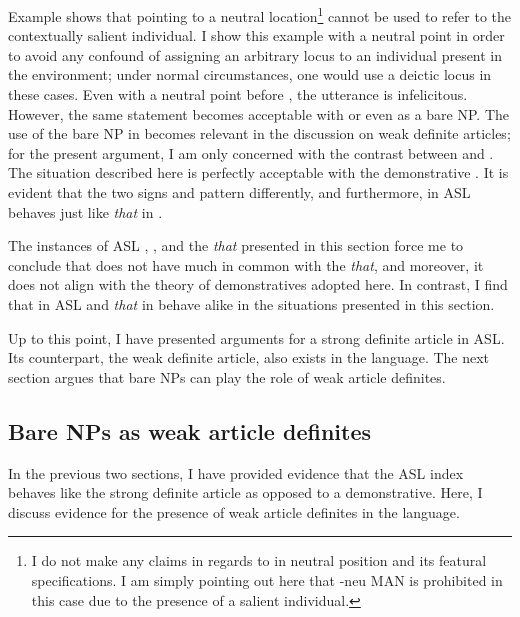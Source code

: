 \documentclass[output=paper,
modfonts
]{langscibook}
\begin{document}
Example  shows that  pointing to a neutral location\footnote{I do not make any claims in regards to  in neutral position and its featural specifications. I am simply pointing out here that -neu MAN is prohibited in this case due to the presence of a salient individual.} cannot be used to refer to the contextually salient individual. I show this example with a neutral point in order to avoid any confound of assigning an arbitrary locus to an individual present in the environment; under normal circumstances, one would use a deictic locus in these cases. Even with a neutral point before , the utterance is infelicitous. However, the same statement becomes acceptable with  or even as a bare NP. The use of the bare NP in  becomes relevant in the discussion on weak definite articles; for the present argument, I am only concerned with the contrast between  and . The situation described here is perfectly acceptable with the demonstrative . It is evident that the two signs  and  pattern differently, and furthermore,  in ASL behaves just like \textit{that} in .   

The instances of ASL , , and the  \textit{that} presented in this section force me to conclude that  does not have much in common with the  \textit{that}, and moreover, it does not align with the theory of demonstratives adopted here. In contrast, I find that  in ASL and \textit{that} in  behave alike in the situations presented in this section.

Up to this point, I have presented arguments for a strong definite article in ASL. Its counterpart, the weak definite article, also exists in the language. The next section argues that bare NPs can play the role of weak article definites. 

\subsection{Bare NPs as weak article definites}

In the previous two sections, I have provided evidence that the ASL index  behaves like the strong definite article as opposed to a demonstrative. Here, I discuss evidence for the presence of weak article definites in the language. 
\end{document}

